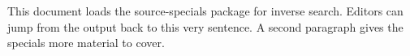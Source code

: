 \documentclass{article}
\begin{document}
This document loads the source-specials package for inverse search.
Editors can jump from the output back to this very sentence.
A second paragraph gives the specials more material to cover.
\end{document}
